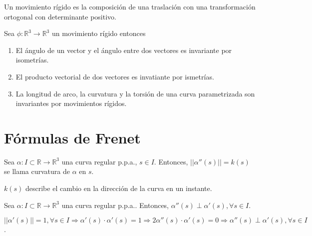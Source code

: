 \begin{defn}
  Un movimiento rígido es la composición de una traslación con una transformación ortogonal con determinante positivo.
\end{defn}



\begin{prop}
  Sea $\phi : \mathbb{R}^{3} \to \mathbb{R}^{3}$ un movimiento rígido entonces
  \begin{enumerate}[label=(\roman*)]
    \item El ángulo de un vector y el ángulo entre dos vectores es invariante por isometrías.
    \item El producto vectorial de dos vectores es invatiante por ismetrías.
    \item La longitud de arco, la curvatura y la torsión de una curva parametrizada son invariantes por movimientos rígidos.
  \end{enumerate}
\end{prop}

\section{Fórmulas de Frenet}

\begin{defn}[Curvatura]
  Sea $\alpha : I \subset \mathbb{R} \to \mathbb{R}^{3}$ una curva regular p.p.a., $s \in I$. Entonces, $||\alpha''(s)|| = k(s)$ se llama curvatura de $\alpha$ en $s$.
\end{defn}
 
\begin{obs}
  $k(s)$ describe el cambio en la dirección de la curva en un instante.
\end{obs}


\begin{prop}
  Sea $\alpha  : I \subset \mathbb{R} \to \mathbb{R}^{3}$ una curva regular p.p.a.. Entonces, $\alpha''(s) \perp \alpha'(s), \forall s \in I$.
\end{prop}

\begin{dem}
  $||\alpha'(s)|| = 1, \forall s \in I \Rightarrow \alpha'(s) \cdot \alpha'(s) = 1 \Rightarrow 2 \alpha''(s) \cdot \alpha'(s) = 0 \Rightarrow \alpha''(s) \perp \alpha'(s), \forall s \in I$.
\end{dem}

